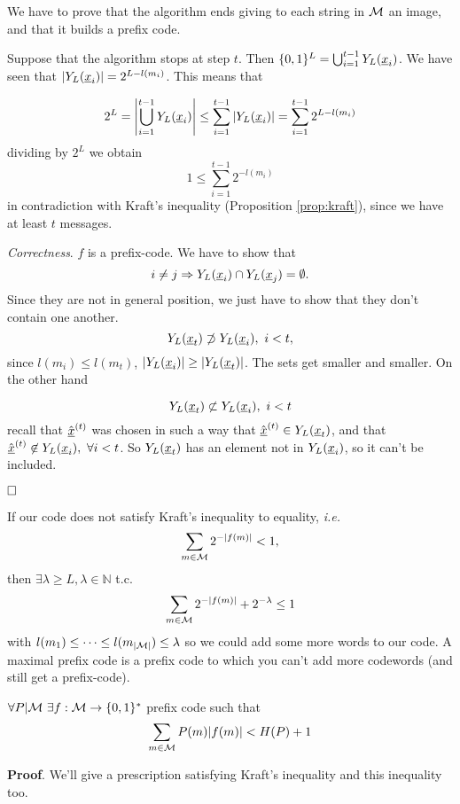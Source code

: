 We have to prove that the algorithm ends giving to each string in $\mathcal{M}$ an image, and that it builds a prefix code.

\noindent Suppose that the algorithm stops at step $t$. Then $\{0, 1\}^L = \bigcup_{i = 1}^{t-1}Y_L(\underline{x}_i)$. We have seen that $|Y_L(\underline{x}_i)| = 2^{L - l(m_i)}$. This means that

\[
2^L = \left|\bigcup_{i=1}^{t-1}Y_L(\underline{x}_i) \right| \leq \sum_{i=1}^{t-1}|Y_L(\underline{x}_i)| = \sum_{i=1}^{t-1} 2^{L-l(m_i)}
\]
dividing by $2^L$ we obtain
$$1 \leq \sum_{i=1}^{t-1}2^{-l(m_i)}$$
in contradiction with Kraft's inequality (Proposition \ref{prop:kraft}), since we have at least $t$ messages. 


\noindent\emph{Correctness}. $f$ is a prefix-code. We have to show that $$i \not= j \Rightarrow Y_L(\underline{x}_i) \cap Y_L(\underline{x}_j) = \emptyset.$$
Since they are not in general position, we just have to show that they don't contain one another. $$Y_L(\underline{x}_t) \not\supset Y_L(\underline{x}_i),\ i < t,$$ since $l(m_i) \leq l(m_t)$, $|Y_L(\underline{x}_i)| \geq |Y_L(\underline{x}_t)|$. The sets get smaller and smaller. On the other hand

$$Y_L(\underline{x}_t) \not\subset Y_L(\underline{x}_i),\ i < t$$
recall that $\hat{\underline{x}}^{(t)}$ was chosen in such a way that $\hat{\underline{x}}^{(t)} \in Y_L(\underline{x}_t)$, and that $\hat{\str{x}}^{(t)} \not\in \prol{\str{x}_i},\ \forall i < t$. So $Y_L(\underline{x}_t)$ has an element not in $Y_L(\underline{x}_i)$, so it can't be included.

$\hfill\Box$

If our code does not satisfy Kraft's inequality to equality, \emph{i.e.} $$\sum_{m\in\mathcal{M}}2^{-|f(m)|} < 1,$$ then $\exists \lambda \geq L, \lambda \in \mathbb{N}$ t.c. $$\sum_{m\in\mathcal{M}}2^{-|f(m)|} + 2^{-\lambda} \leq 1$$ with $l(m_1) \leq \cdots \leq l(m_{|\mathcal{M}|}) \leq \lambda$ so we could add some more words to our code. A maximal prefix code is a prefix code to which you can't add more codewords (and still get a prefix-code).

\begin{prop}
 $\forall P|\mathcal{M}\ \exists f:\mathcal{M} \rightarrow \{0, 1\}^*$ prefix code such that
 \[
  \sum_{m\in \mathcal{M}} P(m)|f(m)| < H(P) + 1
 \]
\end{prop}

\noindent\textbf{Proof}. We'll give a prescription satisfying Kraft's inequality and this inequality too. 

